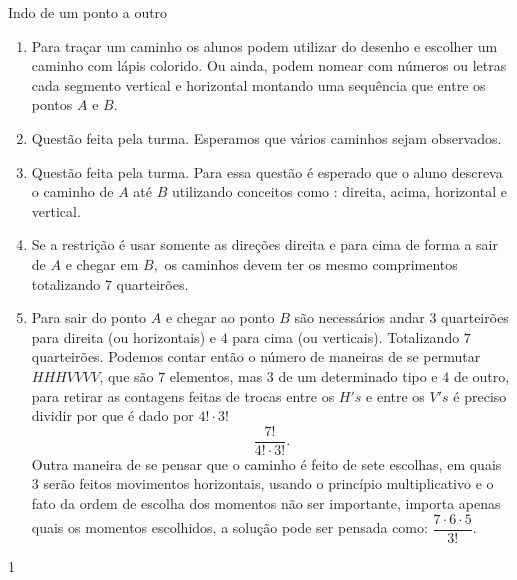 \begin{answer}{Indo de um ponto a outro}
{
\begin{enumerate}
\item Para traçar um caminho  os alunos podem  utilizar do desenho e escolher um caminho com lápis colorido. Ou ainda, podem nomear com números ou letras cada segmento vertical e horizontal montando uma sequência que entre os pontos $A$ e $B.$

\item Questão feita pela turma. Esperamos que vários caminhos sejam observados.

\item Questão feita pela turma. Para essa questão é esperado que o aluno descreva o caminho de $A$ até $B$ utilizando conceitos como : direita, acima, horizontal e vertical. 


\item Se a restrição é usar somente as direções direita e para cima de forma a sair de $A$ e chegar em $B,$ os caminhos devem ter os mesmo comprimentos totalizando $7$ quarteirões. 

\item Para sair do ponto $A$ e chegar ao ponto $B$ são necessários andar $3$ quarteirões para direita (ou horizontais) e $4$ para cima (ou verticais). Totalizando $7$ quarteirões. Podemos contar então o número de maneiras de se permutar $HHHVVVV$, que são $7$ elementos, mas $3$ de um determinado tipo e $4$ de outro, para retirar as contagens feitas de trocas entre os $H's$ e entre os $V's$ é preciso dividir por  que é dado por $4!\cdot3!$ $$\dfrac{7!}{4!\cdot3!}.$$  Outra maneira de se pensar que o caminho é feito de sete escolhas, em quais  $3$ serão feitos movimentos horizontais, usando o princípio multiplicativo e o fato da ordem de escolha dos momentos não ser importante, importa apenas quais os momentos escolhidos, a solução pode ser pensada como:
$\dfrac{7 \cdot 6 \cdot 5}{3!}.$
\end{enumerate}
}{1}
\end{answer}

